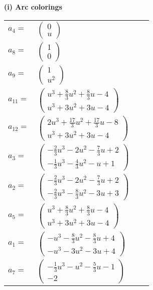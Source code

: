\documentclass[1p]{elsarticle_modified}
\theoremstyle{definition}
\begin{document}
\flushleft \textbf{(i) Arc colorings}\\
\begin{tabular}{m{7pt} m{180pt} m{7pt} m{180pt} }
\flushright $a_{4}=$&$\begin{pmatrix}0\\u\end{pmatrix}$ \\
\flushright $a_{8}=$&$\begin{pmatrix}1\\0\end{pmatrix}$ \\
\flushright $a_{9}=$&$\begin{pmatrix}1\\u^2\end{pmatrix}$ \\
\flushright $a_{11}=$&$\begin{pmatrix}u^3+\frac{8}{3} u^2+\frac{8}{3} u-4\\u^3+3 u^2+3 u-4\end{pmatrix}$ \\
\flushright $a_{12}=$&$\begin{pmatrix}2 u^3+\frac{17}{3} u^2+\frac{17}{3} u-8\\u^3+3 u^2+3 u-4\end{pmatrix}$ \\
\flushright $a_{3}=$&$\begin{pmatrix}-\frac{2}{3} u^3-2 u^2-\frac{7}{3} u+2\\-\frac{1}{3} u^3-\frac{4}{3} u^2- u+1\end{pmatrix}$ \\
\flushright $a_{2}=$&$\begin{pmatrix}-\frac{2}{3} u^3-2 u^2-\frac{7}{3} u+2\\-\frac{2}{3} u^3-\frac{8}{3} u^2-3 u+3\end{pmatrix}$ \\
\flushright $a_{5}=$&$\begin{pmatrix}u^3+\frac{8}{3} u^2+\frac{8}{3} u-4\\u^3+3 u^2+3 u-4\end{pmatrix}$ \\
\flushright $a_{1}=$&$\begin{pmatrix}- u^3-\frac{8}{3} u^2-\frac{8}{3} u+4\\- u^3-3 u^2-3 u+4\end{pmatrix}$ \\
\flushright $a_{7}=$&$\begin{pmatrix}-\frac{1}{3} u^3- u^2-\frac{5}{3} u-1\\-2\end{pmatrix}$ \\

\end{tabular}
\end{document}
